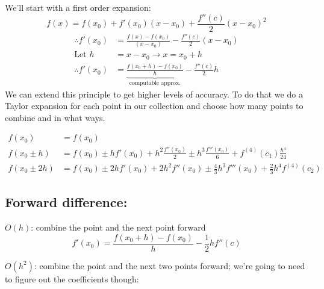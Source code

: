 \documentclass[12pt]{article}
\begin{document}
We'll start with a first order expansion:
\[
f(x) = f(x_0) + f'(x_0)(x - x_0) + \frac{f''(c)}{2}(x-x_0)^2 \]
\begin{align*}
% 
\therefore f'(x_0) &= \frac{f(x) - f(x_0)}{(x - x_0)} - \frac{f''(c)}{2}(x-x_0) \\
%
\text{Let } h &= x-x_0 \rightarrow x = x_0 + h \\
%
\therefore f'(x_0) &= \underbrace{\frac{f(x_0 + h) - f(x_0)}{h}}_{\text{computable approx.}} - \frac{f''(c)}{2}h
\end{align*}
%
We can extend this principle to get higher levels of accuracy. To do that we do a Taylor expansion for each point in our collection and choose how many points to combine and in what ways. 
%
\begin{center}
\end{center}
%
\begin{align*}
f(x_0) &= f(x_0)\\
%
f(x_0 \pm h) &= f(x_0) \pm hf'(x_0) + h^2\frac{f''(x_0)}{2} \pm h^3\frac{f'''(x_0)}{6} + f^{(4)}(c_1)\frac{h^4}{24} \\
%
f(x_0 \pm 2h) &= f(x_0) \pm 2h f'(x_0) + 2 h^2 f''(x_0) \pm \frac{4}{3} h^3 f'''(x_0) + \frac{2}{3}h^4 f^{(4)}(c_2)
\end{align*}


\subsection*{Forward difference:}
\underline{$O(h)$}: combine the point and the next point forward
\[f'(x_0) = \frac{f(x_0 + h) - f(x_0)}{h} - \frac{1}{2}hf''(c)\]

\underline{$O(h^2)$}: combine the point and the next two points forward; we're going to need to figure out the coefficients though:
\end{document}
